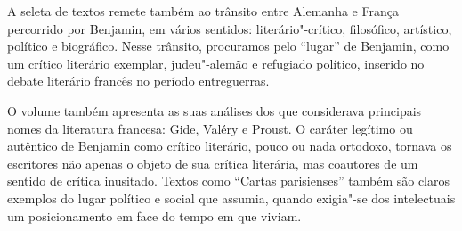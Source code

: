 \hspace*{-7cm}\hrulefill\hspace*{-7cm}

\medskip

  A seleta de textos remete também ao trânsito entre Alemanha e França percorrido por Benjamin, em vários sentidos: literário"-crítico, filosófico, artístico, político e biográfico. Nesse trânsito, procuramos pelo “lugar” de Benjamin, como um crítico literário exemplar, judeu"-alemão e refugiado político, inserido no debate literário francês no período entreguerras.

O volume também apresenta as suas análises dos que considerava principais nomes da literatura francesa: Gide, Valéry e Proust. O caráter legítimo ou autêntico de Benjamin como crítico literário, pouco ou nada ortodoxo, tornava os escritores não apenas o objeto de sua crítica literária, mas coautores de um sentido de crítica inusitado. Textos como “Cartas parisienses” também são claros exemplos do lugar político e social que assumia, quando exigia"-se dos intelectuais um posicionamento em face do tempo em que viviam.


\vfill

\hspace*{-.4cm}\begin{minipage}[c]{.5\linewidth}
\small{
{}}
\end{minipage}



\pagebreak


